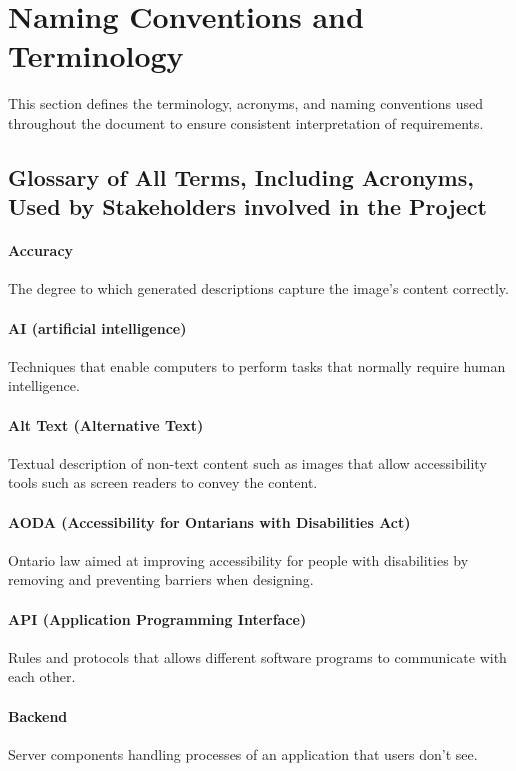 \documentclass[12pt]{article}
\begin{document}
\section{Naming Conventions and Terminology}

This section defines the terminology, acronyms, and naming conventions used throughout the document to ensure consistent interpretation of requirements.

\subsection{Glossary of All Terms, Including Acronyms, Used by Stakeholders
involved in the Project}

\paragraph*{Accuracy}
The degree to which generated descriptions capture the image’s content correctly.

\paragraph*{AI (artificial intelligence)}
Techniques that enable computers to perform tasks that normally require human intelligence.

\paragraph*{Alt Text (Alternative Text)}
Textual description of non-text content such as images that allow accessibility tools such as screen readers to convey the content.

\paragraph*{AODA (Accessibility for Ontarians with Disabilities Act)}
Ontario law aimed at improving accessibility for people with disabilities by removing and preventing barriers when designing.

\paragraph*{API (Application Programming Interface)}
Rules and protocols that allows different software programs to communicate with each other.

\paragraph*{Backend}
Server components handling processes of an application that users don't see.
\end{document}
